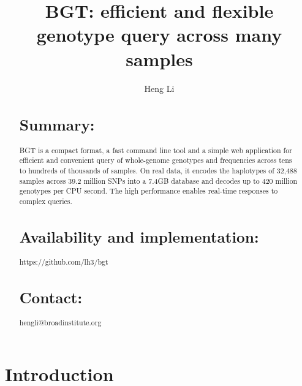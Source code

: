 \documentclass{bioinfo}
\begin{document}

\title[Large-scale Genotype Query]{BGT: efficient and flexible genotype query across many samples}

\author[Li]{Heng Li}

\address{Broad Institute, 75 Ames Street, Cambridge, MA 02142, USA}

\maketitle

\begin{abstract}
\section{Summary:} BGT is a compact format, a fast command line tool and a
simple web application for efficient and convenient query of whole-genome
genotypes and frequencies across tens to hundreds of thousands of samples.
On real data, it encodes the haplotypes of 32,488 samples across 39.2
million SNPs into a 7.4GB database and decodes up to 420 million
genotypes per CPU second. The high performance enables real-time responses to
complex queries.

\section{Availability and implementation:} https://github.com/lh3/bgt

\section{Contact:} hengli@broadinstitute.org
\end{abstract}

\section{Introduction}
\end{document}
